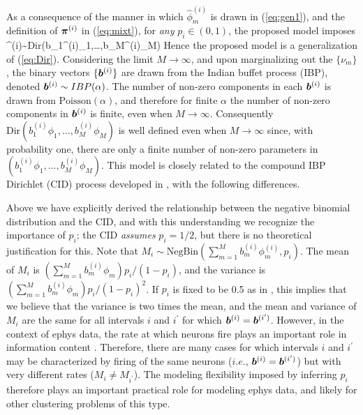 \documentclass[journal]{IEEEtran}
\begin{document}
As a consequence of the manner in which $\hat{\phi}_m^{(i)}$ is drawn in (\ref{eq:gen1}), and the definition of $\boldsymbol{\pi}^{(i)}$ in (\ref{eq:mixt}), for \emph{any} $p_i\in(0,1)$, the proposed model imposes
\beq \piv^{(i)}\sim\mbox{Dir}(b_1^{(i)}{\phi}_1,\dots,b_M^{(i)}{\phi}_M)\eeq
Hence the proposed model is a generalization of (\ref{eq:Dir}). Considering the limit $M\rightarrow\infty$, and upon marginalizing out the $\{\nu_m\}$, the binary vectors $\{\boldsymbol{b}^{(i)}\}$ are drawn from the Indian buffet process (IBP), denoted $\boldsymbol{b}^{(i)}\sim\relax{IBP}(\alpha)$. The number of non-zero components in each $\boldsymbol{b}^{(i)}$ is drawn from $\mbox{Poisson}(\alpha)$, and therefore for finite $\alpha$ the number of non-zero components in $\boldsymbol{b}^{(i)}$ is finite, even when $M\rightarrow\infty$. Consequently $\mbox{Dir}(b_1^{(i)}{\phi}_1,\dots,b_M^{(i)}{\phi}_M)$ is well defined even when $M\rightarrow\infty$ since, with probability one, there are only a finite number of non-zero parameters in $(b_1^{(i)}{\phi}_1,\dots,b_M^{(i)}{\phi}_M)$. This model is closely related to the compound IBP Dirichlet (CID) process developed in \cite{compound}, with the following differences.

Above we have explicitly derived the relationship between the negative binomial distribution and the CID, and with this understanding we recognize the importance of $p_i$; the CID \emph{assumes} $p_i=1/2$, but there is no theoretical justification for this. Note that  $M_i\sim\mbox{NegBin}(\sum_{m=1}^M b_m^{(i)}{\phi}_m^{(i)},p_i)$. The mean of $M_i$ is $(\sum_{m=1}^M b_m^{(i)}{\phi}_m) p_i/(1-p_i)$, and the variance is $(\sum_{m=1}^M b_m^{(i)}{\phi}_m)p_i/(1-p_i)^2$. If $p_i$ is fixed to be  0.5 as in \cite{compound}, this implies that we believe that the variance is two times the mean, and the mean and variance of $M_i$ are the same for all intervals $i$ and $i^\prime$ for which $\boldsymbol{b}^{(i)}=\boldsymbol{b}^{(i^\prime)}$. However, in the context of ephys data, the rate at which neurons fire plays an important role in information content \cite{Donoghue07}. Therefore, there are many cases for which intervals $i$ and $i^\prime$ may be characterized by firing of the same neurons ($i.e.$, $\boldsymbol{b}^{(i)}=\boldsymbol{b}^{(i^\prime)}$) but with very different rates ($M_i\neq M_{i^\prime}$). The modeling flexibility imposed by inferring $p_i$ therefore plays an important practical role for modeling ephys data, and likely for other clustering problems of this type.
\end{document}
